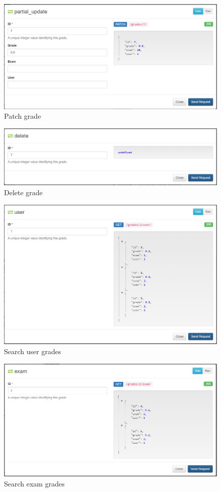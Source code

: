 \documentclass[11pt]{article}
\begin{document}
\begin{figure}[htbp]
\centering
\includegraphics[width=.9\linewidth]{img/patch_grade.png}
\caption{Patch grade}
\end{figure}
\begin{figure}[htbp]
\centering
\includegraphics[width=.9\linewidth]{img/delete_grade.png}
\caption{Delete grade}
\end{figure}
\begin{figure}[htbp]
\centering
\includegraphics[width=.9\linewidth]{img/get_user_grade.png}
\caption{Search user grades}
\end{figure}
\begin{figure}[htbp]
\centering
\includegraphics[width=.9\linewidth]{img/get_exam_grade.png}
\caption{Search exam grades}
\end{figure}
\end{document}
